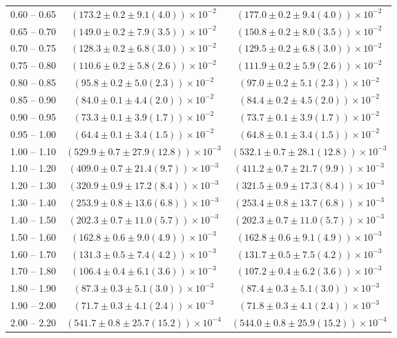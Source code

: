 \begin{table}
\begin{center}
\begin{tabular}{ c | c c }
0.60 -- 0.65 & $(173.2\pm0.2\pm9.1(4.0))\times10^{-2}$ & $(177.0\pm0.2\pm9.4(4.0))\times10^{-2}$ \\ 
0.65 -- 0.70 & $(149.0\pm0.2\pm7.9(3.5))\times10^{-2}$ & $(150.8\pm0.2\pm8.0(3.5))\times10^{-2}$ \\ 
0.70 -- 0.75 & $(128.3\pm0.2\pm6.8(3.0))\times10^{-2}$ & $(129.5\pm0.2\pm6.8(3.0))\times10^{-2}$ \\ 
0.75 -- 0.80 & $(110.6\pm0.2\pm5.8(2.6))\times10^{-2}$ & $(111.9\pm0.2\pm5.9(2.6))\times10^{-2}$ \\ 
0.80 -- 0.85 & $(95.8\pm0.2\pm5.0(2.3))\times10^{-2}$ & $(97.0\pm0.2\pm5.1(2.3))\times10^{-2}$ \\ 
0.85 -- 0.90 & $(84.0\pm0.1\pm4.4(2.0))\times10^{-2}$ & $(84.4\pm0.2\pm4.5(2.0))\times10^{-2}$ \\ 
0.90 -- 0.95 & $(73.3\pm0.1\pm3.9(1.7))\times10^{-2}$ & $(73.7\pm0.1\pm3.9(1.7))\times10^{-2}$ \\ 
0.95 -- 1.00 & $(64.4\pm0.1\pm3.4(1.5))\times10^{-2}$ & $(64.8\pm0.1\pm3.4(1.5))\times10^{-2}$ \\ 
1.00 -- 1.10 & $(529.9\pm0.7\pm27.9(12.8))\times10^{-3}$ & $(532.1\pm0.7\pm28.1(12.8))\times10^{-3}$ \\ 
1.10 -- 1.20 & $(409.0\pm0.7\pm21.4(9.7))\times10^{-3}$ & $(411.2\pm0.7\pm21.7(9.9))\times10^{-3}$ \\ 
1.20 -- 1.30 & $(320.9\pm0.9\pm17.2(8.4))\times10^{-3}$ & $(321.5\pm0.9\pm17.3(8.4))\times10^{-3}$ \\ 
1.30 -- 1.40 & $(253.9\pm0.8\pm13.6(6.8))\times10^{-3}$ & $(253.4\pm0.8\pm13.7(6.8))\times10^{-3}$ \\ 
1.40 -- 1.50 & $(202.3\pm0.7\pm11.0(5.7))\times10^{-3}$ & $(202.3\pm0.7\pm11.0(5.7))\times10^{-3}$ \\ 
1.50 -- 1.60 & $(162.8\pm0.6\pm9.0(4.9))\times10^{-3}$ & $(162.8\pm0.6\pm9.1(4.9))\times10^{-3}$ \\ 
1.60 -- 1.70 & $(131.3\pm0.5\pm7.4(4.2))\times10^{-3}$ & $(131.7\pm0.5\pm7.5(4.2))\times10^{-3}$ \\ 
1.70 -- 1.80 & $(106.4\pm0.4\pm6.1(3.6))\times10^{-3}$ & $(107.2\pm0.4\pm6.2(3.6))\times10^{-3}$ \\ 
1.80 -- 1.90 & $(87.3\pm0.3\pm5.1(3.0))\times10^{-3}$ & $(87.4\pm0.3\pm5.1(3.0))\times10^{-3}$ \\ 
1.90 -- 2.00 & $(71.7\pm0.3\pm4.1(2.4))\times10^{-3}$ & $(71.8\pm0.3\pm4.1(2.4))\times10^{-3}$ \\ 
2.00 -- 2.20 & $(541.7\pm0.8\pm25.7(15.2))\times10^{-4}$ & $(544.0\pm0.8\pm25.9(15.2))\times10^{-4}$ \\ 

\end{tabular}
\end{center}
\end{table}
